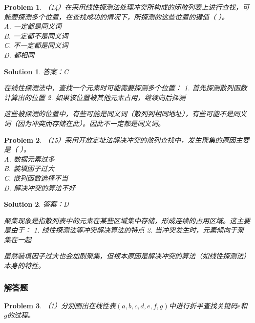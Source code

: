 \documentclass[12pt,a4paper]{amsart}
\newtheorem{problem}{Problem}[section]
\newtheorem{solution}{Solution}[section]
\begin{document}
\begin{problem}
（14）在采用线性探测法处理冲突所构成的闭散列表上进行查找，可能要探测多个位置，在查找成功的情况下，所探测的这些位置的键值（ ）。\\
A. 一定都是同义词\\
B. 一定都不是同义词\\
C. 不一定都是同义词\\
D. 都相同
\end{problem}

\begin{solution}
答案：C

在线性探测法中，查找一个元素时可能需要探测多个位置：
1. 首先探测散列函数计算出的位置
2. 如果该位置被其他元素占用，继续向后探测

这些被探测的位置中，有些可能是同义词（散列到相同地址），有些可能不是同义词（因为冲突而存储在此）。因此不一定都是同义词。
\end{solution}

\begin{problem}
（15）采用开放定址法解决冲突的散列查找中，发生聚集的原因主要是（ ）。\\
A. 数据元素过多\\
B. 装填因子过大\\
C. 散列函数选择不当\\
D. 解决冲突的算法不好
\end{problem}

\begin{solution}
答案：D

聚集现象是指散列表中的元素在某些区域集中存储，形成连续的占用区域。这主要是由于：
1. 线性探测法等冲突解决算法的特点
2. 当冲突发生时，元素倾向于聚集在一起

虽然装填因子过大也会加剧聚集，但根本原因是解决冲突的算法（如线性探测法）本身的特性。
\end{solution}

\subsubsection{解答题}

\begin{problem}
（1）分别画出在线性表$(a,b,c,d,e,f,g)$中进行折半查找关键码$e$和$g$的过程。
\end{problem}
\end{document}
